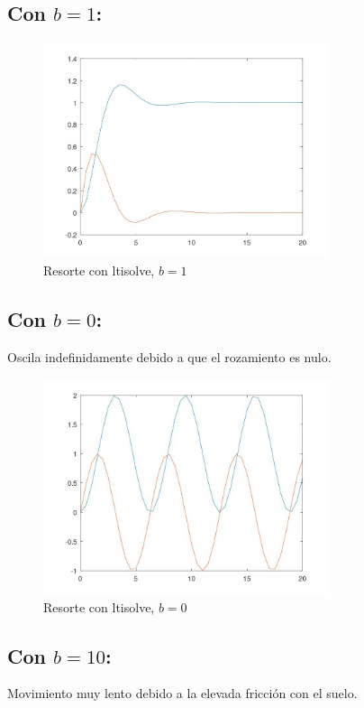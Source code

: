 \documentclass[a4paper,12pt]{article}
\begin{document}
\subsection*{Con \( b = 1 \):}
\begin{figure}[H]
\centering
\includegraphics[width=0.75\textwidth]{img/ej3_1.jpeg}
\caption{Resorte con ltisolve, \( b = 1 \)}
\end{figure}

\subsection*{Con \( b = 0 \):}
Oscila indefinidamente debido a que el rozamiento es nulo.

\begin{figure}[H]
\centering
\includegraphics[width=0.75\textwidth]{img/ej3_2.jpeg}
\caption{Resorte con ltisolve, \( b = 0 \)}
\end{figure}

\subsection*{Con \( b = 10 \):}
Movimiento muy lento debido a la elevada fricción con el suelo.
\end{document}
